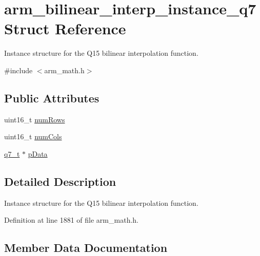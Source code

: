 \hypertarget{structarm__bilinear__interp__instance__q7}{}\section{arm\+\_\+bilinear\+\_\+interp\+\_\+instance\+\_\+q7 Struct Reference}
\label{structarm__bilinear__interp__instance__q7}


Instance structure for the Q15 bilinear interpolation function.  




{\ttfamily \#include $<$arm\+\_\+math.\+h$>$}

\subsection*{Public Attributes}
\begin{DoxyCompactItemize}
\item 
uint16\+\_\+t \hyperlink{structarm__bilinear__interp__instance__q7_ad5a8067cab5f9ea4688b11a623e16607}{num\+Rows}
\item 
uint16\+\_\+t \hyperlink{structarm__bilinear__interp__instance__q7_a860dd0d24380ea06cfbb348fb3b12c9a}{num\+Cols}
\item 
\hyperlink{arm__math_8h_ae541b6f232c305361e9b416fc9eed263}{q7\+\_\+t} $\ast$ \hyperlink{structarm__bilinear__interp__instance__q7_af05194d691bbefb02c34bafb22ca9ef0}{p\+Data}
\end{DoxyCompactItemize}


\subsection{Detailed Description}
Instance structure for the Q15 bilinear interpolation function. 

Definition at line 1881 of file arm\+\_\+math.\+h.



\subsection{Member Data Documentation}
\mbox{\label{structarm__bilinear__interp__instance__q7_a860dd0d24380ea06cfbb348fb3b12c9a}} 
